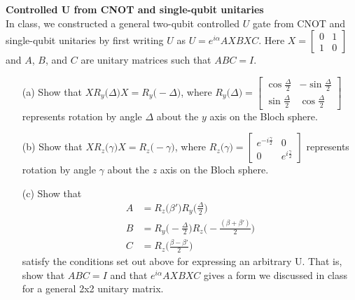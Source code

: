\documentclass[12pt,letterpaper,boxed,cm]{hmcpset}
\begin{document}
\begin{problem}[4.]
    \textbf{Controlled U from CNOT and single-qubit unitaries}\\
    In class, we constructed a general two-qubit controlled $U$ gate from CNOT and single-qubit unitaries by first writing $U$ as $U=e^{i\alpha}AXBXC$.  Here $X = \begin{bmatrix} 0 & 1 \\ 1 & 0 \end{bmatrix}$ and $A$, $B$, and $C$ are unitary matrices such that $ABC=I$.
    \begin{enumerate}
        \item [(a)] Show that $XR_y\bigl(\Delta\bigr)X = R_y\bigl(-\Delta\bigr)$, where $R_y\bigl(\Delta\bigr) = \begin{bmatrix} \cos \frac{\Delta}{2} & -\sin \frac{\Delta}{2} \\ \sin \frac{\Delta}{2} & \cos \frac{\Delta}{2} \end{bmatrix}$ represents rotation by angle $\Delta$ about the $y$ axis on the Bloch sphere.
        \item [(b)] Show that $XR_z\bigl(\gamma\bigr)X = R_z\bigl(-\gamma\bigr)$, where $R_z\bigl(\gamma\bigr) = \begin{bmatrix} e^{-i\frac{\gamma}{2}} & 0 \\ 0 & e^{i\frac{\gamma}{2}} \end{bmatrix}$ represents rotation by angle $\gamma$ about the $z$ axis on the Bloch sphere.
        \item [(c)] Show that 
        \begin{align}
            A &= R_z\bigl(\beta'\bigr) R_y\bigl(\frac{\Delta}{2}\bigr) \nonumber \\
            B &= R_y\bigl(-\frac{\Delta}{2}\bigr)R_z\bigl(-\frac{(\beta+\beta')}{2}\bigr) \nonumber \\
            C &= R_z\bigl(\frac{\beta-\beta'}{2}\bigr) \nonumber
        \end{align}
        satisfy the conditions set out above for expressing an arbitrary U.  That is, show that $ABC=I$ and that $e^{i\alpha}AXBXC$ gives a form we discussed in class for a general 2x2 unitary matrix.
    \end{enumerate}
\end{problem}

\begin{solution}
    \vfill
\end{solution}
\newpage
\end{document}

